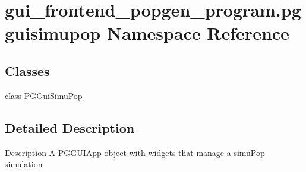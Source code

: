 \hypertarget{namespacegui__frontend__popgen__program_1_1pgguisimupop}{}\section{gui\+\_\+frontend\+\_\+popgen\+\_\+program.\+pgguisimupop Namespace Reference}
\label{namespacegui__frontend__popgen__program_1_1pgguisimupop}
\subsection*{Classes}
\begin{DoxyCompactItemize}
\item 
class \hyperlink{classgui__frontend__popgen__program_1_1pgguisimupop_1_1PGGuiSimuPop}{P\+G\+Gui\+Simu\+Pop}
\end{DoxyCompactItemize}


\subsection{Detailed Description}
\begin{DoxyVerb}Description
A PGGUIApp object with widgets that manage a simuPop simulation
\end{DoxyVerb}
 